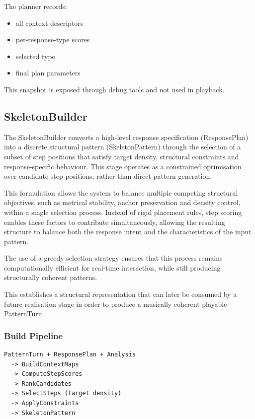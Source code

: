 The planner records:

\begin{itemize}
\item
  all context descriptors
\item
  per-response-type scores
\item
  selected type
\item
  final plan parameters
\end{itemize}

This snapshot is exposed through debug tools and not used in playback.

\subsection{SkeletonBuilder}\label{skeletonbuilder}

The SkeletonBuilder converts a high-level response specification
(ResponsePlan) into a discrete structural pattern (SkeletonPattern)
through the selection of a subset of step positions that satisfy target
density, structural constraints and response-specific behaviour. This
stage operates as a constrained optimisation over candidate step
positions, rather than direct pattern generation.

This formulation allows the system to balance multiple competing
structural objectives, such as metrical stability, anchor preservation
and density control, within a single selection process. Instead of rigid
placement rules, step scoring enables these factors to contribute
simultaneously, allowing the resulting structure to balance both the
response intent and the characteristics of the input pattern.

The use of a greedy selection strategy ensures that this process remains
computationally efficient for real-time interaction, while still
producing structurally coherent patterns.

This establishes a structural representation that can later be consumed
by a future realisation stage in order to produce a musically coherent
playable PatternTurn.

\subsubsection{Build Pipeline}\label{build-pipeline}

\begin{lstlisting}
PatternTurn + ResponsePlan + Analysis
  -> BuildContextMaps
  -> ComputeStepScores
  -> RankCandidates
  -> SelectSteps (target density)
  -> ApplyConstraints
  -> SkeletonPattern
\end{lstlisting}

